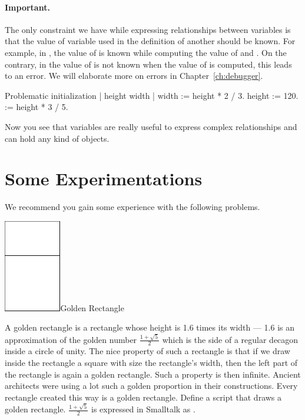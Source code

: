 \paragraph{Important.} The only constraint we have while expressing relationships between variables is that the value of variable used in the definition of
another should be known. For example, in ,
the value of  is known while computing the value of
 and \ct{\dist}.  On the contrary, in  the value of  is not known when the value of  is computed, this leads to an error. We will elaborate more on errors in Chapter~\ref{ch:debugger}.

\begin{scriptwithtitle}{Problematic  initialization}\label{src:wrong}
| height width \dist |
width := height * 2 / 3.
height := 120.
\dist := height * 3 / 5.
\end{scriptwithtitle}

Now you see that variables are really useful to express complex relationships and can hold any kind of objects.

\section{Some Experimentations}
We recommend you gain some experience with the following problems.

\begin{exofigwithsizeandtitle}[.8]{\includegraphics[width=2.5cm]{varGoldenRec}}{Golden Rectangle}\label{exo:goldenrectangle}

A golden rectangle is a rectangle whose height is 1.6 times its width
--- 1.6 is an approximation of the golden number $\frac{1 +
\sqrt{5}}{2}$ which is the side of a regular decagon inside a circle
of unity.  The nice property of such a rectangle is that if we draw
inside the rectangle a square with size the rectangle's width, then
the left part of the rectangle is again a golden rectangle. Such a
property is then infinite. Ancient architects were using a lot such a golden proportion in their constructions. Every rectangle created this way is a
golden rectangle. Define a script that draws a golden rectangle.
$\frac{1 + \sqrt{5}}{2}$ is expressed in Smalltalk as .

\end{exofigwithsizeandtitle}


